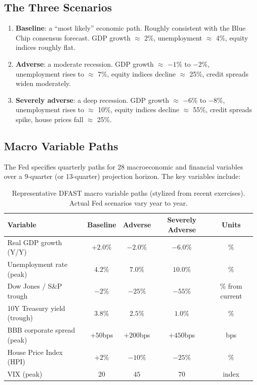 \documentclass[11pt, a4paper]{article}
\theoremstyle{definition}
\theoremstyle{plain}
\theoremstyle{remark}
\begin{document}
\subsection{The Three Scenarios}

\begin{enumerate}
    \item \textbf{Baseline}: a ``most likely'' economic path.
          Roughly consistent with the Blue Chip consensus forecast.
          GDP growth $\approx$ 2\%, unemployment $\approx$ 4\%, equity indices roughly flat.
    \item \textbf{Adverse}: a moderate recession.
          GDP growth $\approx$ $-1$\% to $-2$\%, unemployment rises to $\approx$ 7\%,
          equity indices decline $\approx$ 25\%, credit spreads widen moderately.
    \item \textbf{Severely adverse}: a deep recession.
          GDP growth $\approx$ $-6$\% to $-8$\%, unemployment rises to $\approx$ 10\%,
          equity indices decline $\approx$ 55\%, credit spreads spike,
          house prices fall $\approx$ 25\%.
\end{enumerate}

\subsection{Macro Variable Paths}

The Fed specifies quarterly paths for 28 macroeconomic and financial variables
over a 9-quarter (or 13-quarter) projection horizon.
The key variables include:

\begin{table}[H]
\centering
\begin{tabular}{@{}lcccc@{}}
\toprule
\textbf{Variable} & \textbf{Baseline} & \textbf{Adverse} & \textbf{Severely Adverse} & \textbf{Units} \\
\midrule
Real GDP growth (Y/Y) & $+2.0\%$ & $-2.0\%$ & $-6.0\%$ & \% \\
Unemployment rate (peak) & $4.2\%$ & $7.0\%$ & $10.0\%$ & \% \\
Dow Jones / S\&P trough & $-2\%$ & $-25\%$ & $-55\%$ & \% from current \\
10Y Treasury yield (trough) & $3.8\%$ & $2.5\%$ & $1.0\%$ & \% \\
BBB corporate spread (peak) & $+50$bps & $+200$bps & $+450$bps & bps \\
House Price Index (HPI) & $+2\%$ & $-10\%$ & $-25\%$ & \% \\
VIX (peak) & $20$ & $45$ & $70$ & index \\
\bottomrule
\end{tabular}
\caption{Representative DFAST macro variable paths (stylized from recent exercises).
Actual Fed scenarios vary year to year.}
\end{table}
\end{document}
